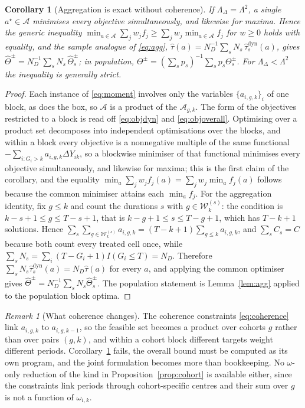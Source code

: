 \documentclass[12pt]{article}
\newtheorem{corollary}{Corollary}
\theoremstyle{remark}
\newtheorem{remark}{Remark}
\begin{document}
\begin{corollary}[Aggregation is exact without coherence]
\label{cor:exact}
If $\Lambda_\Delta = \Lambda^2$, a single $a^{\star} \in \mathcal{A}$ minimises every
objective simultaneously, and likewise for maxima. Hence the generic inequality
$\min_{a \in \mathcal{A}}\sum_j w_j f_j \ge \sum_j w_j \min_{a \in \mathcal{A}} f_j$ for
$w \ge 0$ holds with \emph{equality}, and the sample analogue of \eqref{eq:agg},
$\widehat\tau(a) = N_D^{-1}\sum_s N_s\, \widehat\tau^{\mathrm{dyn}}_s(a)$, gives
$\widehat\Theta^{\pm} = N_D^{-1}\sum_s N_s\, \widehat\Theta^{\pm}_s$; in population,
$\Theta^{\pm} = (\sum_s p_s)^{-1}\sum_s p_s \Theta^{\pm}_s$. For
$\Lambda_\Delta < \Lambda^2$ the inequality is generally strict.
\end{corollary}

\begin{proof}
Each instance of \eqref{eq:moment} involves only the variables $\{a_{i,g,k}\}_i$ of one
block, as does the box, so $\mathcal{A}$ is a product of the $\mathcal{A}_{g,k}$. The
form of the objectives restricted to a block is read off \eqref{eq:objdyn} and
\eqref{eq:objoverall}. Optimising over a product set decomposes into independent
optimisations over the blocks, and within a block every objective is a nonnegative
multiple of the same functional $-\sum_{i : G_i > k} a_{i,g,k}\Delta Y_{ik}$, so a
blockwise minimiser of that functional minimises every objective simultaneously, and
likewise for maxima; this is the first claim of the corollary, and the equality
$\min_a \sum_j w_j f_j(a) = \sum_j w_j \min_a f_j(a)$ follows because the common minimiser
attains each $\min_a f_j$. For the aggregation identity, fix $g \le k$ and count the
durations $s$ with $g \in \mathcal{W}^{(s)}_k$: the condition is $k - s + 1 \le g \le
T - s + 1$, that is $k - g + 1 \le s \le T - g + 1$, which has $T - k + 1$ solutions.
Hence $\sum_s \sum_{g \in \mathcal{W}^{(s)}_k} a_{i,g,k} = (T{-}k{+}1)\sum_{g \le k} a_{i,g,k}$,
and $\sum_s C_s = C$ because both count every treated cell once, while $\sum_s N_s =
\sum_i (T - G_i + 1)I(G_i \le T) = N_D$. Therefore $\sum_s N_s \widehat\tau^{\mathrm{dyn}}_s(a)
= N_D \widehat\tau(a)$ for every $a$, and applying the common optimiser gives
$\widehat\Theta^{\pm} = N_D^{-1}\sum_s N_s\widehat\Theta^{\pm}_s$. The population statement
is Lemma~\ref{lem:agg} applied to the population block optima.
\end{proof}

\begin{remark}[What coherence changes]
\label{rmk:couple}
The coherence constraints \eqref{eq:coherence} link $a_{i,g,k}$ to $a_{i,g,k-1}$, so the
feasible set becomes a product over cohorts $g$ rather than over pairs $(g,k)$, and within
a cohort block different targets weight different periods. Corollary~\ref{cor:exact}
fails, the overall bound must be computed as its own program, and the joint formulation
becomes more than bookkeeping. No $\omega$-only reduction of the kind in
Proposition~\ref{prop:cohort} is available either, since the constraints link periods
through cohort-specific centres and their sum over $g$ is not a function of
$\omega_{i,k}$.
\end{remark}
\end{document}
